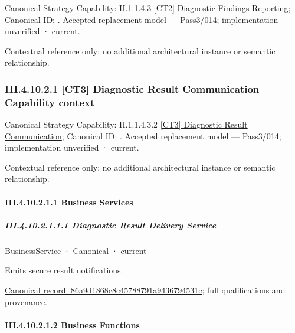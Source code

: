 {\small Canonical Strategy Capability: II.1.1.4.3 \hyperref[element:dc9a2828b2524ddf8bbfb6adf32926f4]{[CT2] Diagnostic Findings Reporting}; Canonical ID: \texttt{}. Accepted replacement model — Pass3/014; implementation unverified · current.}\par
Contextual reference only; no additional architectural instance or semantic relationship.\par
\subsubsection*{III.4.10.2.1 [CT3] Diagnostic Result Communication — Capability context}
\label{navigation:III.4.10.2.1}

{\small Canonical Strategy Capability: II.1.1.4.3.2 \hyperref[element:1eb70d951f164ed8a0b75ce1704b9083]{[CT3] Diagnostic Result Communication}; Canonical ID: \texttt{}. Accepted replacement model — Pass3/014; implementation unverified · current.}\par
Contextual reference only; no additional architectural instance or semantic relationship.\par
\paragraph*{III.4.10.2.1.1 Business Services}
\label{navigation:III.4.10.2.1.1}

\subparagraph*{III.4.10.2.1.1.1 Diagnostic Result Delivery Service}
\label{navigation:III.4.10.2.1.1.1}

\label{element:86a9d1868c8c45788791a9436794531c}
{\small BusinessService · Canonical · current}\par

Emits secure result notifications.


{\footnotesize \href{../../../../continuum/business/business-service/86a9d1868c8c45788791a9436794531c.md}{Canonical record: 86a9d1868c8c45788791a9436794531c}; full qualifications and provenance.}\par
\paragraph*{III.4.10.2.1.2 Business Functions}
\label{navigation:III.4.10.2.1.2}

